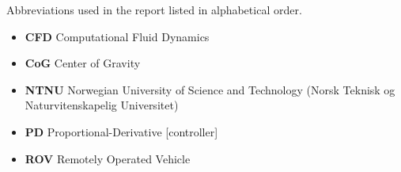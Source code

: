 \documentclass[class=article, crop=false]{standalone}
\begin{document}
Abbreviations used in the report listed in alphabetical order.
\begin{itemize}
    \item \textbf{CFD} Computational Fluid Dynamics
    \item \textbf{CoG} Center of Gravity
    \item \textbf{NTNU} Norwegian University of Science and Technology (Norsk Teknisk og Naturvitenskapelig Universitet)   
     \item \textbf{PD} Proportional-Derivative [controller]
    \item \textbf{ROV} Remotely Operated Vehicle
\end{itemize}
\end{document}
